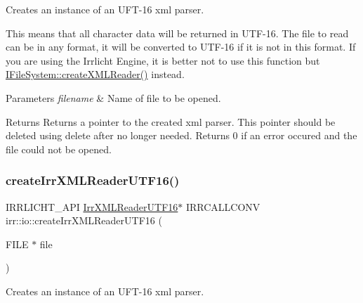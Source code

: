 Creates an instance of an U\+F\+T-\/16 xml parser. 

This means that all character data will be returned in U\+T\+F-\/16. The file to read can be in any format, it will be converted to U\+T\+F-\/16 if it is not in this format. If you are using the Irrlicht Engine, it is better not to use this function but \hyperlink{classirr_1_1io_1_1IFileSystem_a167c9fa159d16ee5c56c074636b0865e}{I\+File\+System\+::create\+X\+M\+L\+Reader()} instead. 
\begin{DoxyParams}{Parameters}
{\em filename} & Name of file to be opened. \\
\hline
\end{DoxyParams}
\begin{DoxyReturn}{Returns}
Returns a pointer to the created xml parser. This pointer should be deleted using \textquotesingle{}delete\textquotesingle{} after no longer needed. Returns 0 if an error occured and the file could not be opened. 
\end{DoxyReturn}
\mbox{\label{namespaceirr_1_1io_a7e7ecf8350b446da3a4080f3949bc0b1}} 
\subsubsection{\texorpdfstring{create\+Irr\+X\+M\+L\+Reader\+U\+T\+F16()}{createIrrXMLReaderUTF16()}\hspace{0.1cm}{\footnotesize\ttfamily [2/3]}}
{\footnotesize\ttfamily I\+R\+R\+L\+I\+C\+H\+T\+\_\+\+A\+PI \hyperlink{namespaceirr_1_1io_a5eb4094dfd0d509e0cd8a9d1dd30a5b9}{Irr\+X\+M\+L\+Reader\+U\+T\+F16}$\ast$ I\+R\+R\+C\+A\+L\+L\+C\+O\+NV irr\+::io\+::create\+Irr\+X\+M\+L\+Reader\+U\+T\+F16 (\begin{DoxyParamCaption}\item[{F\+I\+LE $\ast$}]{file }\end{DoxyParamCaption})}



Creates an instance of an U\+F\+T-\/16 xml parser. 

